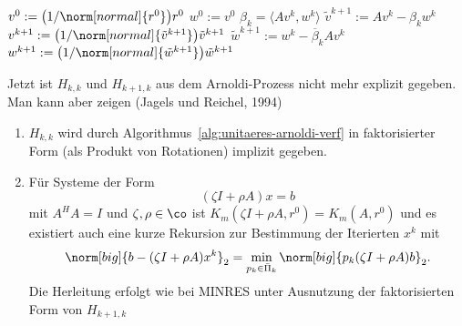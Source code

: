 \begin{bsp}
  \begin{alg}\label{alg:unitaeres-arnoldi-verf}
    \begin{algorithm}
      \begin{algorithmic}
        \STATE $v^0 := \bigl(1/\norm[normal]{r^0}\bigr)r^0$
        \STATE $w^0 := v^0$
          \STATE $\beta_k = \langle Av^k,w^k\rangle$
          \STATE $\tilde v^{k+1} := Av^k-\beta_k w^k$
          \STATE $v^{k+1}
            :=\bigl(1/\norm[normal]{\tilde v^{k+1}}\bigr)\tilde v^{k+1}$
          \STATE $\tilde w^{k+1} := w^k-\overline{\beta}_k Av^k$
          \STATE $w^{k+1}
            :=\bigl(1/\norm[normal]{\tilde w^{k+1}}\bigr)\tilde w^{k+1}$
        \ENDFOR
      \end{algorithmic}
    \end{algorithm}
  \end{alg}

  Jetzt ist $H_{k,k}$ und $H_{k+1,k}$ aus dem Arnoldi-Prozess nicht
  mehr explizit gegeben. Man kann aber zeigen (Jagels und Reichel, 1994)
  \begin{enumerate}
  \item $H_{k,k}$ wird durch Algorithmus~\ref{alg:unitaeres-arnoldi-verf}
    in faktorisierter Form (als Produkt von Rotationen) implizit gegeben.
  \item F\"ur Systeme der Form
    \begin{equation*}
      (\zeta I+\rho A)x=b
    \end{equation*}
    mit $A^HA=I$ und $\zeta,\rho\in\co$ ist
    $K_m(\zeta I+\rho A,r^0)=K_m(A,r^0)$ und es existiert auch eine
    kurze Rekursion zur Bestimmung der Iterierten $x^k$ mit
    \begin{equation*}
      \norm[big]{b-(\zeta I+\rho A)x^k}_2
      =
      \min_{p_k\in\bar \Pi_k}
      \norm[big]{p_k(\zeta I+\rho A)b}_2
      .
    \end{equation*}
    Die Herleitung erfolgt wie bei MINRES unter Ausnutzung der faktorisierten
    Form von $H_{k+1,k}$
  \end{enumerate}

\end{bsp}





